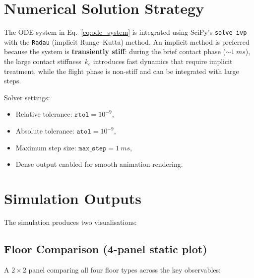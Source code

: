 \documentclass[11pt,a4paper]{article}
\begin{document}
\section{Numerical Solution Strategy}

The ODE system in Eq.~\eqref{eq:ode_system} is integrated using SciPy's
\texttt{solve\_ivp} with the \texttt{Radau} (implicit Runge--Kutta) method.
An implicit method is preferred because the system is \textbf{transiently
stiff}: during the brief contact phase (${\sim}\SI{1}{ms}$), the large
contact stiffness~$k_c$ introduces fast dynamics that require implicit
treatment, while the flight phase is non-stiff and can be integrated with
large steps.

Solver settings:
\begin{itemize}[nosep]
  \item Relative tolerance: $\texttt{rtol} = 10^{-9}$,
  \item Absolute tolerance: $\texttt{atol} = 10^{-9}$,
  \item Maximum step size: $\texttt{max\_step} = \SI{1}{ms}$,
  \item Dense output enabled for smooth animation rendering.
\end{itemize}

\section{Simulation Outputs}

The simulation produces two visualisations:

\subsection{Floor Comparison (4-panel static plot)}

A $2 \times 2$ panel comparing all four floor types across the key
observables:
\end{document}
